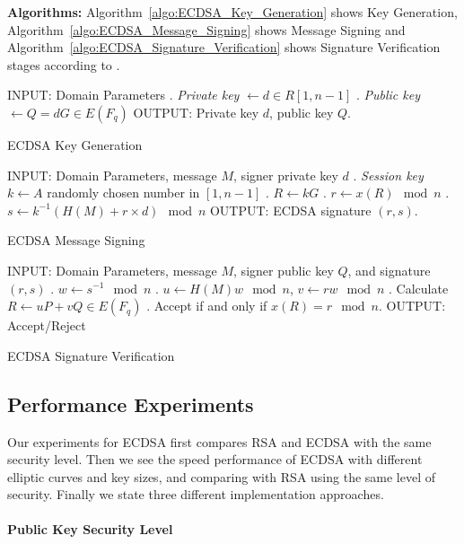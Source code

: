 \documentclass[10pt,sigconf]{acmart}
\begin{document}
\vspace{0.2em}

\noindent \textbf{Algorithms:} \quad Algorithm~\ref{algo:ECDSA_Key_Generation} shows Key Generation, Algorithm~\ref{algo:ECDSA_Message_Signing} shows Message Signing and Algorithm~\ref{algo:ECDSA_Signature_Verification} shows Signature Verification stages according to \cite{karati2014new}.

\begin{algorithm}[H]
\begin{algorithmic}
\STATE INPUT: Domain Parameters
. \textit{Private key} $\gets d \in R [1, n-1]$
. \textit{Public key} $\gets Q = dG \in E(F_q)$
\STATE OUTPUT: Private key $d$, public key $Q$.
\end{algorithmic}
\caption{ECDSA Key Generation}
\label{algo:ECDSA_Key_Generation}
\end{algorithm}

\begin{algorithm}[H]
\begin{algorithmic}
\STATE INPUT: Domain Parameters, message $M$, signer private key $d$
. \textit{Session key} $k \gets A$ randomly chosen number in $[1,n-1]$
. $R \gets kG$
. $r \gets x(R)\mod n$
. $s \gets k^{-1}(H(M) + r \times d) \mod n$
\STATE OUTPUT: ECDSA signature $(r,s)$.
\end{algorithmic}
\caption{ECDSA Message Signing}
\label{algo:ECDSA_Message_Signing}
\end{algorithm}

\begin{algorithm}[H]
\begin{algorithmic}
\STATE INPUT: Domain Parameters, message $M$, signer public key $Q$, and signature $(r,s)$
. $w \gets s^{-1} \mod n$
. $u \gets H(M)w \mod n$, $v \gets rw \mod n$
. Calculate $R \gets uP + vQ \in E(F_q)$
. Accept if and only if $x(R) = r \mod n$.
\STATE OUTPUT: Accept/Reject
\end{algorithmic}
\caption{ECDSA Signature Verification}
\label{algo:ECDSA_Signature_Verification}
\end{algorithm}

\subsection{Performance Experiments}

Our experiments for ECDSA first compares RSA and ECDSA with the same security level. Then we see the speed performance of ECDSA with different elliptic curves and key sizes, and comparing with RSA using the same level of security. Finally we state three different implementation approaches.
\\
\\
\noindent \textbf{Public Key Security Level}
\end{document}
